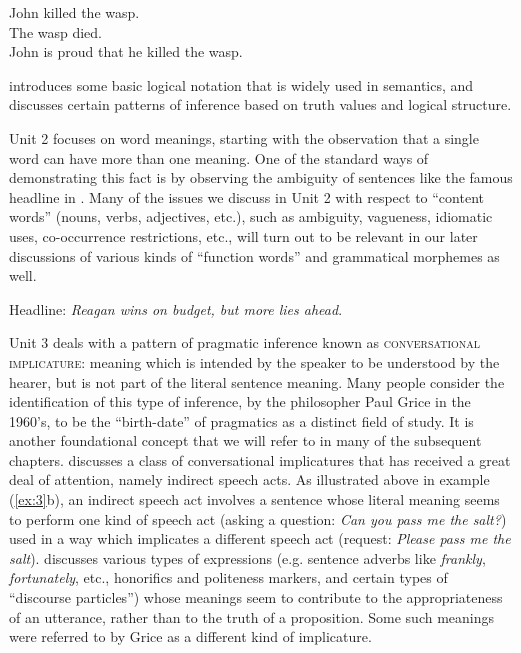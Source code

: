 \ea \label{ex:4}
\ea John killed the wasp.\\
\ex The wasp died.\\
\ex John is proud that he killed the wasp.
                       \z
\z


 introduces some basic logical notation that is widely used in semantics, and discusses certain patterns of inference based on truth values and logical structure.



Unit 2 focuses on word meanings, starting with the observation that a single word can have more than one meaning. One of the standard ways of demonstrating this fact is by observing the ambiguity of sentences like the famous headline in . Many of the issues we discuss in Unit 2 with respect to “content words” (nouns, verbs, adjectives, etc.), such as ambiguity, vagueness, idiomatic uses, co-occurrence restrictions, etc., will turn out to be relevant in our later discussions of various kinds of “function words” and grammatical morphemes as well.


\ea \label{ex:5}
Headline: \textit{Reagan wins on budget, but more lies ahead}.
\z


Unit 3 deals with a pattern of pragmatic inference known as \textsc{conversational implicature}: meaning which is intended by the speaker to be understood by the hearer, but is not part of the literal sentence meaning. Many people consider the identification of this type of inference, by the philosopher Paul Grice in the 1960’s, to be the “birth-date” of pragmatics as a distinct field of study. It is another foundational concept that we will refer to in many of the subsequent chapters.  discusses a class of conversational implicatures that has received a great deal of attention, namely indirect speech acts. As illustrated above in example (\ref{ex:3}b), an indirect speech act involves a sentence whose literal meaning seems to perform one kind of speech act (asking a question: \textit{Can you pass me the salt?}) used in a way which implicates a different speech act (request: \textit{Please pass me the salt}).  discusses various types of expressions (e.g. sentence adverbs like \textit{frankly}, \textit{fortunately}, etc., honorifics and politeness markers, and certain types of “discourse particles”) whose meanings seem to contribute to the appropriateness of an utterance, rather than to the truth of a proposition. Some such meanings were referred to by Grice as a different kind of implicature.



